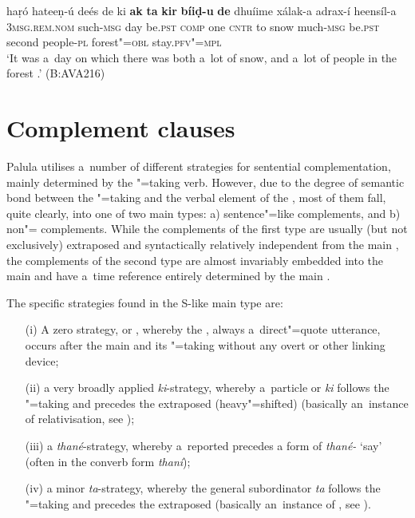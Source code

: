 \begin{exe}
\ex
\label{ex:13-126}
\gll haṛó hateeṇ-ú deés de ki \textbf{ak} \textbf{ta} \textbf{kir} \textbf{bíiḍ-u} \textbf{de} dhuíime xálak-a  adrax-í heensíl-a \\
\textsc{3msg.rem.nom} such-\textsc{msg}  day be.\textsc{pst} \textsc{comp} one \textsc{cntr} to snow much-\textsc{msg} be.\textsc{pst} second people-\textsc{pl}  forest"=\textsc{obl} stay.\textsc{pfv"=mpl} \\
\glt `It was a~day on which there was both a~lot of snow, and a~lot of people in the forest .' (B:AVA216)
\end{exe}

\section{Complement clauses}
\label{sec:13-5}

Palula utilises a~number of different strategies for sentential complementation, mainly determined by the "=taking verb. However, due to the degree of semantic bond between the "=taking  and the verbal element of the  \citep[39-40]{givon2001b}, most of them fall, quite clearly, into one of two main types: a) sentence"=like complements, and b) non"= complements. While the complements of the first type are usually (but not exclusively) extraposed and syntactically relatively independent from the main , the complements of the second type are almost invariably embedded into the main  and have a~time reference entirely determined by the main .

The specific strategies found in the S-like main type are:

\begin{enumerate}
\item[(i)] A zero strategy, or , whereby the , always a~direct"=quote utterance, occurs after the main  and its "=taking  without any overt  or other linking device;
\item[(ii)] a very broadly applied \textit{ki}-strategy, whereby a~particle or  \textit{ki} follows the "=taking  and precedes the extraposed (heavy"=shifted)   (basically an~instance of relativisation, see );
\item[(iii)] a \textit{thané}-strategy, whereby a~reported   precedes a form of \textit{thané-} `say' (often in the converb form \textit{thaní});
\item[(iv)] a minor \textit{ta}-strategy, whereby the general subordinator \textit{ta} follows the "=taking  and precedes the extraposed   (basically an~instance of , see ).
\end{enumerate}

